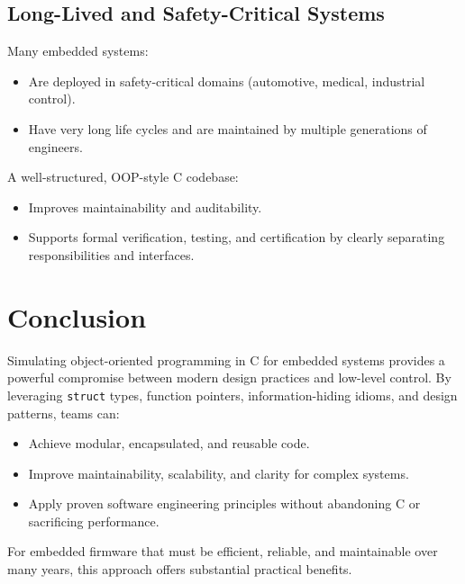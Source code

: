 \documentclass[11pt]{article}
\begin{document}
\subsection{Long-Lived and Safety-Critical Systems}

Many embedded systems:
\begin{itemize}[nosep]
  \item Are deployed in safety-critical domains (automotive, medical, industrial control).
  \item Have very long life cycles and are maintained by multiple generations of engineers.
\end{itemize}

A well-structured, OOP-style C codebase:
\begin{itemize}[nosep]
  \item Improves maintainability and auditability.
  \item Supports formal verification, testing, and certification by clearly separating responsibilities and interfaces.
\end{itemize}

\section{Conclusion}

Simulating object-oriented programming in C for embedded systems provides a powerful compromise between modern design practices and low-level control. By leveraging \texttt{struct} types, function pointers, information-hiding idioms, and design patterns, teams can:
\begin{itemize}[nosep]
  \item Achieve modular, encapsulated, and reusable code.
  \item Improve maintainability, scalability, and clarity for complex systems.
  \item Apply proven software engineering principles without abandoning C or sacrificing performance.
\end{itemize}

For embedded firmware that must be efficient, reliable, and maintainable over many years, this approach offers substantial practical benefits.
\end{document}
